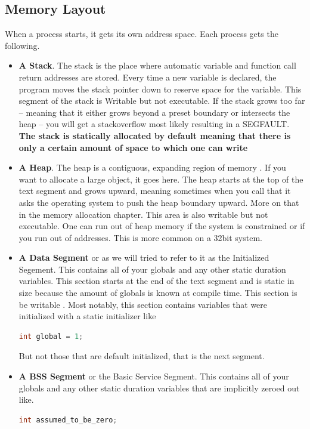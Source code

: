 \subsection{Memory Layout}

When a process starts, it gets its own address space. Each process gets the following.

\begin{itemize}
\item \textbf{A Stack}.
The stack is the place where automatic variable and function call return addresses are stored.
Every time a new variable is declared, the program moves the stack pointer down to reserve space for the variable.
This segment of the stack is Writable but not executable.
If the stack grows too far -- meaning that it either grows beyond a preset boundary or intersects the heap -- you will get a stackoverflow most likely resulting in a SEGFAULT.
\textbf{The stack is statically allocated by default meaning that there is only a certain amount of space to which one can write}

\item \textbf{A Heap}.
The heap is a contiguous, expanding region of memory \cite{mallocinternals}.
If you want to allocate a large object, it goes here.
The heap starts at the top of the text segment and grows upward, meaning sometimes when you call  that it asks the operating system to push the heap boundary upward.
More on that in the memory allocation chapter.
This area is also writable but not executable.
One can run out of heap memory if the system is constrained or if you run out of addresses.
This is more common on a 32bit system.

\item \textbf{A Data Segment} or as we will tried to refer to it as the Initialized Segement. This contains all of your globals and any other static duration variables.
This section starts at the end of the text segment and is static in size because the amount of globals is known at compile time.
This section is be writable \cite[P. 124]{van1994expert}.
Most notably, this section contains variables that were initialized with a static initializer like

\begin{lstlisting}[language=C]
int global = 1;
\end{lstlisting}

But not those that are default initialized, that is the next segment.

\item \textbf{A BSS Segment} or the Basic Service Segment. This contains all of your globals and any other static duration variables that are implicitly zeroed out like.
\begin{lstlisting}[language=C]
int assumed_to_be_zero;
\end{lstlisting}


\end{itemize}
